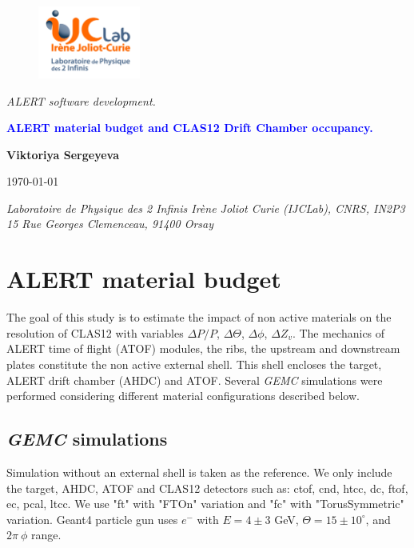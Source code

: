 \documentclass[11pt,a4paper,english]{article}
\begin{document}
		\renewcommand{\bibname}{Bibliography}
	
\begin{titlepage}
	\begin{figure}
		\includegraphics[width=0.3\textwidth]{logo_IJCLab.jpg}
	\end{figure}
	 
	\centering
	\vspace{20cm}		
	\textit{ALERT software development.}
	
	\vspace{5cm}	
		
	\Large {\textbf { \textcolor{blue} {ALERT material budget and CLAS12 Drift Chamber occupancy.}}}
	
	\vspace{10cm}
	
	\Large{\textbf {Viktoriya Sergeyeva}}
	
	\today
	
	\vspace{1.5cm}
	\centering		
	\small { \textit {Laboratoire de Physique des 2 Infinis Irène Joliot Curie (IJCLab), CNRS, IN2P3 \\ 15 Rue Georges Clemenceau, 91400 Orsay}}	
\end{titlepage}


\newpage

\section{ALERT material budget}
The goal of this study is to estimate the impact of non active materials on the resolution of CLAS12 with variables $\Delta P / P$, $\Delta \Theta$, $\Delta \phi$, $\Delta Z_v$. The mechanics of ALERT time of flight (ATOF) modules, the ribs, the upstream and downstream plates constitute the non active external shell. This shell encloses the target, ALERT drift chamber (AHDC) and ATOF. Several \textit{GEMC} simulations were performed considering different material configurations described below.
	\subsection{\textit{GEMC} simulations}
	Simulation without an external shell is taken as the reference. We only include the target, AHDC, ATOF and CLAS12 detectors such as: ctof, cnd, htcc, dc, ftof, ec, pcal, ltcc. We use "ft" with "FTOn" variation and "fc" with "TorusSymmetric" variation. Geant4 particle gun uses $e^{-}$ with $E = 4 \pm 3$ GeV, $\Theta = 15 \pm 10 ^{\circ}$, and $2\pi \ \phi$ range.
	
\end{document}
